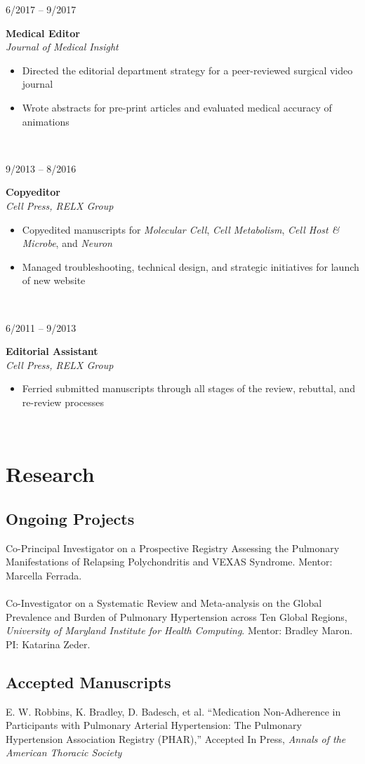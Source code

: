 \documentclass{article}
\newcommand\colleft{.20}
\newcommand\colright{.75}
\newcommand{\entryfour}[4]
	{
		\begin{minipage}[t]{\colleft\textwidth}
		\hfill \textsc{#1}
		\end{minipage}
		\hfill\vline\hfill
		\begin{minipage}[t]{\colright\textwidth}
		{\bf#2}\\
		\textit{#3}
		\footnotesize{#4}
		\end{minipage}\\
		\entryvspace
	}%
\newcommand{\entryvspace}{\vspace{0.5em}}
\begin{document}
		\entryfour{6/2017 -- 9/2017}{Medical Editor}{Journal of Medical Insight}{%
		\begin{itemize}
			\item Directed the editorial department strategy for a peer-reviewed surgical video journal
			\item Wrote abstracts for pre-print articles and evaluated medical accuracy of animations
		\end{itemize}
		}
		
		\entryfour{9/2013 -- 8/2016}{Copyeditor}{Cell Press, RELX Group}{%
			\begin{itemize}
				\item Copyedited manuscripts for \emph{Molecular Cell}, \emph{Cell Metabolism}, \emph{Cell Host \& Microbe}, and \emph{Neuron}
				\item Managed troubleshooting, technical design, and strategic initiatives for launch of new website 
			\end{itemize}
		}
		
		\entryfour{6/2011 -- 9/2013}{Editorial Assistant}{Cell Press, RELX Group}{%
			\begin{itemize}
				\item Ferried submitted manuscripts through all stages of the review, rebuttal, and re-review processes
			\end{itemize}
		}

\section*{Research}
	\nocite{*}
	\subsection*{Ongoing Projects}
		Co-Principal Investigator on a Prospective Registry Assessing the Pulmonary Manifestations of Relapsing Polychondritis and VEXAS Syndrome.
		Mentor: Marcella Ferrada.
		\\ \\
		Co-Investigator on a Systematic Review and Meta-analysis on the Global Prevalence and Burden of Pulmonary Hypertension across Ten Global Regions, \textit{University of Maryland Institute for Health Computing}.
		Mentor: Bradley Maron. PI: Katarina Zeder.
	\subsection*{Accepted Manuscripts}
		E. W. Robbins, K. Bradley, D. Badesch, et al. ``Medication Non-Adherence in Participants with Pulmonary Arterial Hypertension: The Pulmonary Hypertension Association Registry (PHAR),'' Accepted In Press, \emph{Annals of the American Thoracic Society}
\end{document}
